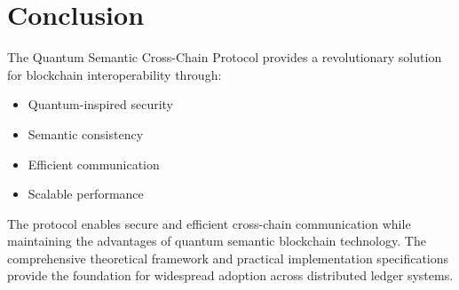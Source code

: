 \documentclass[12pt]{article}
\begin{document}
\section{Conclusion}

The Quantum Semantic Cross-Chain Protocol provides a revolutionary solution for blockchain interoperability through:

\begin{itemize}
\item Quantum-inspired security
\item Semantic consistency
\item Efficient communication
\item Scalable performance
\end{itemize}

The protocol enables secure and efficient cross-chain communication while maintaining the advantages of quantum semantic blockchain technology. The comprehensive theoretical framework and practical implementation specifications provide the foundation for widespread adoption across distributed ledger systems.
\end{document}
